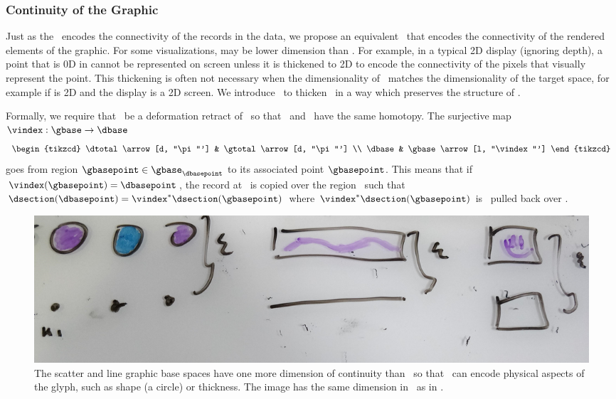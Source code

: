 \documentclass[../main.tex]{subfiles}
\begin{document}
\subsubsection{Continuity of the Graphic \gbase} 
\label{sec:graphic_base}
Just as the \dbase\ encodes the connectivity of the records in the data, we propose an equivalent \gbase\ that encodes the connectivity of the rendered elements of the graphic. For some visualizations, \dbase may be lower dimension than \gbase. For example, in a typical 2D display (ignoring depth), a point that is 0D in \dbase cannot be represented on screen unless it is thickened to 2D to encode the connectivity of the pixels that visually represent the point. This thickening is often not necessary when the dimensionality of \dbase\ matches the dimensionality of the target space, for example if \dbase is 2D and the display is a 2D screen. We introduce \gbase\ to thicken \dbase\ in a way which preserves the structure of \dbase. 

Formally, we require that \dbase\ be a deformation retract\cite{RetractionTopology2020} of \gbase\ so that \dbase\ and \gbase\ have the same homotopy. The surjective map $\vindex: \gbase \rightarrow \dbase$ 
\begin{equation}
    \begin{tikzcd}
        \dtotal \arrow[d, "\pi"'] & \gtotal \arrow[d, "\pi"'] \\
        \dbase                   & \gbase \arrow[l, "\vindex"']
    \end{tikzcd}
\end{equation}
goes from region $\gbasepoint \in \gbase_{\dbasepoint}$ to its associated point $\gbasepoint$. This means that if $\vindex(\gbasepoint) = \dbasepoint$, the record at \dbasepoint\ is copied over the region \gbasepoint\ such that $\dsection(\dbasepoint)=\vindex^*\dsection(\gbasepoint)$ where $\vindex^*\dsection(\gbasepoint)$  is \dsection\ pulled back over \gbase. 

\begin{figure}
    \includegraphics[width=1\textwidth]{figures/math/retraction_maps.png}
    \caption{The scatter and line graphic base spaces have one more dimension of continuity than \dbase\ so that \gbase\ can encode physical aspects of the glyph, such as shape (a circle) or thickness. The image has the same dimension in \gbase\ as in \dbase. }
    \label{fig:graphic_retraction_map}
\end{figure}
\end{document}
